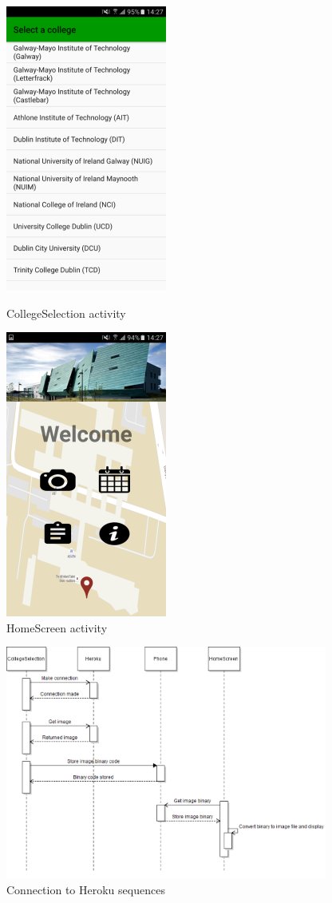 \begin{figure}[!b]
	\begin{minipage}[b]{0.47\textwidth}
		\includegraphics{img/collegeselection.png}
		\caption{CollegeSelection activity}
	\end{minipage}
	\hfill
	\begin{minipage}[b]{0.47\textwidth}
		\includegraphics{img/homescreen.png}
		\caption{HomeScreen activity}
	\end{minipage}
\end{figure}

\begin{figure}[!hb]
	\centering
	\includegraphics{img/heroku-connection.png}
	\caption{Connection to Heroku sequences}
\end{figure}


